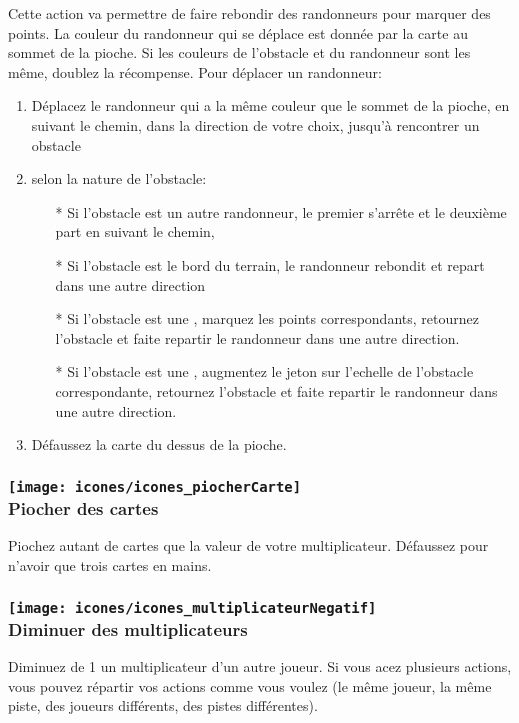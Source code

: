Cette action va permettre de faire rebondir des randonneurs pour marquer des points. La couleur du randonneur qui se déplace est donnée par la carte au sommet de la pioche. Si les couleurs de l'obstacle et du randonneur sont les même, doublez la récompense. Pour déplacer un randonneur:
\begin{enumerate}
\item Déplacez le randonneur qui a la même couleur que le sommet de la pioche, en suivant le chemin, dans la direction de votre choix, jusqu'à rencontrer un obstacle
\item selon la nature de l'obstacle:
\begin{itemize}
\item[*] Si l'obstacle est un autre randonneur, le premier s'arrête et le deuxième part en suivant le chemin,
\item[*] Si l'obstacle est le bord du terrain, le randonneur rebondit et repart dans une autre direction
\item[*] Si l'obstacle est une \faceValeur, marquez les points correspondants, retournez l'obstacle et faite repartir le randonneur dans une autre direction.
\item[*] Si l'obstacle est une \faceObstacle, augmentez le jeton sur l'echelle de l'obstacle correspondante, retournez l'obstacle et faite repartir le randonneur dans une autre direction.
\end{itemize}
\item Défaussez la carte du dessus de la pioche.
\end{enumerate}


\subsubsection*{\texttt{[image: icones/icones\_piocherCarte]} \\ Piocher des cartes}
Piochez autant de cartes que la valeur de votre multiplicateur. Défaussez pour n'avoir que trois cartes en mains.

\subsubsection*{\texttt{[image: icones/icones\_multiplicateurNegatif]} \\ Diminuer des multiplicateurs}
Diminuez de 1 un multiplicateur d'un autre joueur. Si vous acez plusieurs actions, vous pouvez répartir vos actions comme vous voulez (le même joueur, la même piste, des joueurs différents, des pistes différentes).

